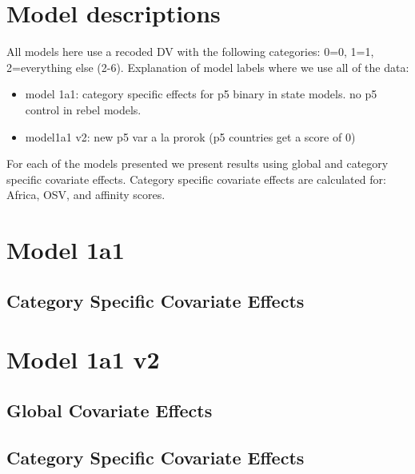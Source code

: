 \documentclass[]{article}
\begin{document}
\tableofcontents

\clearpage

\section{Model descriptions}

All models here use a recoded DV with the following categories: 0=0, 1=1, 2=everything else (2-6). Explanation of model labels where we use all of the data:

\begin{itemize}
	\item model 1a1: category specific effects for p5 binary in state models. no p5 control in rebel models.
	\item model1a1 v2: new p5 var a la prorok (p5 countries get a score of 0)
\end{itemize}

For each of the models presented we present results using global and category specific covariate effects. Category specific covariate effects are calculated for: Africa, OSV, and affinity scores.
\clearpage

\section{Model 1a1}
\subsection{Category Specific Covariate Effects}

\clearpage

\section{Model 1a1 v2}
\subsection{Global Covariate Effects}

\clearpage
\subsection{Category Specific Covariate Effects}

\clearpage
\end{document}
